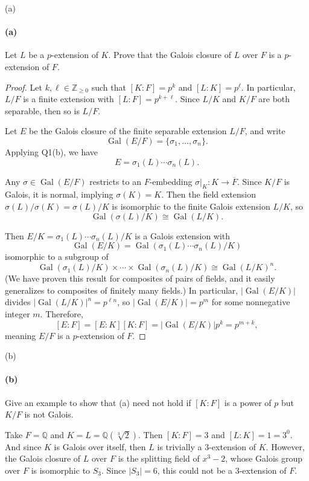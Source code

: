 \documentclass[12pt]{article}
\newenvironment{fullbox}{\begin{lrbox}{\savefullbox}\begin{minipage}{\dimexpr\textwidth-2\fboxsep\relax}}{\end{minipage}\end{lrbox}\begin{center}\framebox[\textwidth]{\usebox{\savefullbox}}\end{center}}
\newenvironment{pbox}[1][]{\begin{fullbox}\ifx#1\empty\else\paragraph{#1}\fi}{\end{fullbox}}
\newcommand{\Z}{\mathbb{Z}}
\newcommand{\Q}{\mathbb{Q}}
\newcommand{\<}{\langle}
\renewcommand{\>}{\rangle}
\newcommand{\isom}{\cong}
\newcommand{\clo}{\overline}
\DeclareMathOperator{\Gal}{Gal}
\begin{document}
\begin{pbox}[(a)]
    Let $L$ be a $p$-extension of $K$. Prove that the Galois closure of $L$ over $F$ is a $p$-extension of $F$.
\end{pbox}

\begin{proof}
    Let $k, \ell \in \Z_{\geq0}$ such that $[K : F] = p^k$ and $[L : K] = p^\ell$. In particular, $L/F$ is a finite extension with $[L : F] = p^{k + \ell}$. Since $L/K$ and $K/F$ are both separable, then so is $L/F$. 

    Let $E$ be the Galois closure of the finite separable extension $L/F$, and write
    \[
        \Gal(E/F) = \{\sigma_1, \dots, \sigma_n\}.
    \]
    Applying Q1(b), we have
    \[
        E = \sigma_1(L) \cdots \sigma_n(L).
    \]

    Any $\sigma \in \Gal(E/F)$ restricts to an $F$-embedding $\sigma|_K : K \to \clo{F}$. Since $K/F$ is Galois, it is normal, implying $\sigma(K) = K$. Then the field extension $\sigma(L)/\sigma(K) = \sigma(L)/K$ is isomorphic to the finite Galois extension $L/K$, so
    \[
        \Gal(\sigma(L)/K) \isom \Gal(L/K).
    \]

    Then $E/K = \sigma_1(L) \cdots \sigma_n(L)/K$ is a Galois extension with
    \[
        \Gal(E/K) = \Gal(\sigma_1(L) \cdots \sigma_n(L)/K)
    \]
    isomorphic to a subgroup of
    \[
        \Gal(\sigma_1(L)/K) \times \cdots \times \Gal(\sigma_n(L)/K) \isom \Gal(L/K)^n.
    \]
    (We have proven this result for composites of pairs of fields, and it easily generalizes to composites of finitely many fields.) In particular, $|\Gal(E/K)|$ divides $|\Gal(L/K)|^n = p^{\ell n}$, so $|\Gal(E/K)| = p^m$ for some nonnegative integer $m$. Therefore,
    \[
        [E : F] = [E : K][K : F] = |\Gal(E/K)|p^k = p^{m + k},
    \]
    meaning $E/F$ is a $p$-extension of $F$.

\end{proof}

\begin{pbox}[(b)]
    Give an example to show that (a) need not hold if $[K : F]$ is a power of $p$ but $K/F$ is not Galois.
\end{pbox}

Take $F = \Q$ and $K = L = \Q(\sqrt[3]{2})$. Then $[K : F] = 3$ and $[L : K] = 1 = 3^0$. And since $K$ is Galois over itself, then $L$ is trivially a $3$-extension of $K$. However, the Galois closure of $L$ over $F$ is the splitting field of $x^3 - 2$, whose Galois group over $F$ is isomorphic to $S_3$. Since $|S_3| = 6$, this could not be a $3$-extension of $F$.
\end{document}
